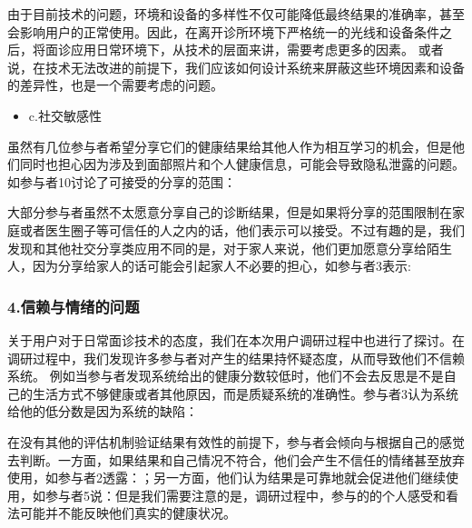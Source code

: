 由于目前技术的问题，环境和设备的多样性不仅可能降低最终结果的准确率，甚至会影响用户的正常使用。因此，在离开诊所环境下严格统一的光线和设备条件之后，将面诊应用日常环境下，从技术的层面来讲，需要考虑更多的因素。
或者说，在技术无法改进的前提下，我们应该如何设计系统来屏蔽这些环境因素和设备的差异性，也是一个需要考虑的问题。

\begin{itemize}
\item c.社交敏感性
\end{itemize}


虽然有几位参与者希望分享它们的健康结果给其他人作为相互学习的机会，但是他们同时也担心因为涉及到面部照片和个人健康信息，可能会导致隐私泄露的问题。
如参与者10讨论了可接受的分享的范围：

大部分参与者虽然不太愿意分享自己的诊断结果，但是如果将分享的范围限制在家庭或者医生圈子等可信任的人之内的话，他们表示可以接受。不过有趣的是，我们发现和其他社交分享类应用不同的是，对于家人来说，他们更加愿意分享给陌生人，因为分享给家人的话可能会引起家人不必要的担心，如参与者3表示: 


\subsubsection{4.信赖与情绪的问题}
关于用户对于日常面诊技术的态度，我们在本次用户调研过程中也进行了探讨。在调研过程中，我们发现许多参与者对产生的结果持怀疑态度，从而导致他们不信赖系统。
例如当参与者发现系统给出的健康分数较低时，他们不会去反思是不是自己的生活方式不够健康或者其他原因，而是质疑系统的准确性。参与者3认为系统给他的低分数是因为系统的缺陷：

在没有其他的评估机制验证结果有效性的前提下，参与者会倾向与根据自己的感觉去判断。一方面，如果结果和自己情况不符合，他们会产生不信任的情绪甚至放弃使用，如参与者2透露：；另一方面，他们认为结果是可靠地就会促进他们继续使用，如参与者5说：但是我们需要注意的是，调研过程中，参与的的个人感受和看法可能并不能反映他们真实的健康状况。

